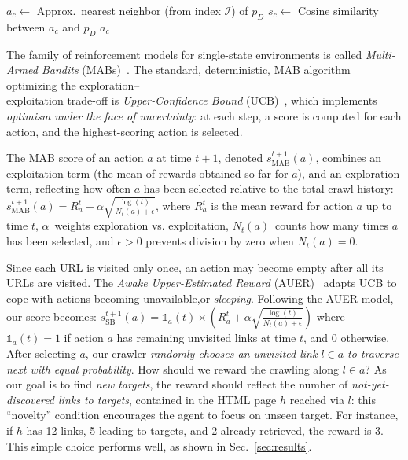 \begin{algorithm}[t!]
	\caption{Finding the action for a hyperlink $l$, $\lambda(l)$$=$$p$}\label{alg:url_mapping}

	$a_c\gets$ Approx.\ nearest neighbor (from index $\mathcal{I}$) of $p_D$\;
	$s_c \gets$ Cosine similarity between $a_c$ and $p_D$\;
	\Return $a_c$
\end{algorithm}


The family of reinforcement models for single-state environments is called \emph{Multi-Armed Bandits} (MABs)~\cite{sutton2018reinforcement}. The standard, deterministic, MAB algorithm optimizing the exploration--\\exploitation trade-off is \emph{Upper-Confidence Bound} (UCB)~\cite{auer2002finite}, which implements \emph{optimism under the face of uncertainty}: 
at each step, a score is computed for each action, and the highest-scoring action is selected.

The MAB score of an action $a$ at time $t+1$, denoted $ s_{\textrm{MAB}}^{t+1}(a)$, combines an exploitation term (the mean of rewards obtained so far for $a$), and an exploration term, reflecting how often $a$ has been selected relative to the total crawl history:
\(
	s_{\textrm{MAB}}^{t+1}(a) = R_a^t + \alpha \sqrt{\frac{\log(t)}{N_t(a)
  + \epsilon}}
\), 
where $R_a^t$ is the mean reward for action $a$ up to time $t$, $\alpha$~weights exploration vs. exploitation, $N_t(a)$~counts how many times $a$ has been selected, and $\epsilon > 0$ prevents division by zero when $N_t(a)=0$.


Since each URL is visited only once, an action may become empty after all its URLs are visited. The  \emph{Awake Upper-Estimated Reward} (AUER)~\cite{kleinberg2010regret} adapts UCB to cope with actions becoming unavailable,or \emph{sleeping}. Following the AUER model, our score becomes:
\(
	s_{\textrm{SB}}^{t+1}(a) = \mathds{1}_a(t) \times \left(R_a^t + \alpha \sqrt{\frac{\log(t)}{N_t(a) + \epsilon}}\right)
\)
where $\mathds{1}_a(t)=1$ if action $a$ has remaining unvisited links at time $t$, and $0$ otherwise. After selecting $a$, our crawler \emph{randomly chooses an unvisited link $l \in a$ to traverse next with equal probability}.
How should we reward the crawling along $l\in a$? As our goal is to find \emph{new targets}, the reward should reflect the number of \emph{not-yet-discovered links to targets}, contained in the HTML page $h$ reached via $l$: this ``novelty'' condition encourages the agent to focus on unseen target.
For instance, if $h$ has 12 links, 5 leading to targets, and 2 already retrieved, the reward is $3$. This simple choice performs well, as shown in Sec.~\ref{sec:results}.


